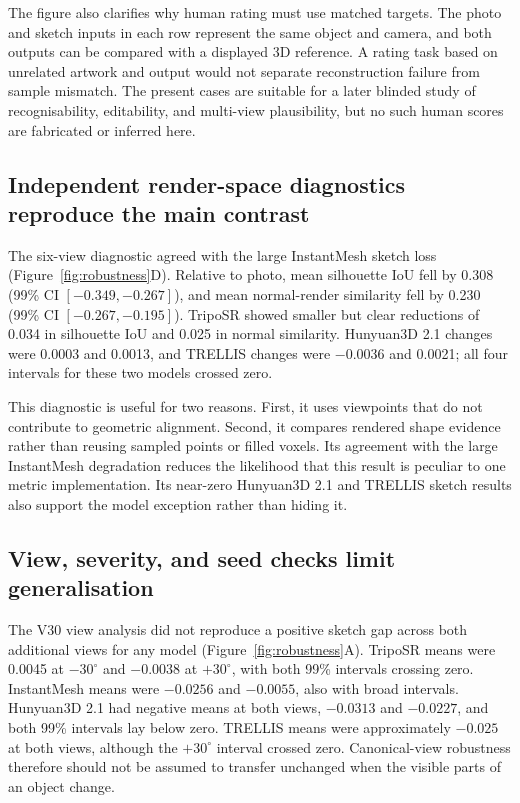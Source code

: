 \documentclass[12pt,a4paper]{article}
\begin{document}
The figure also clarifies why human rating must use matched targets. The photo and sketch inputs in each row represent the same object and camera, and both outputs can be compared with a displayed 3D reference. A rating task based on unrelated artwork and output would not separate reconstruction failure from sample mismatch. The present cases are suitable for a later blinded study of recognisability, editability, and multi-view plausibility, but no such human scores are fabricated or inferred here.

\subsection{Independent render-space diagnostics reproduce the main contrast}

The six-view diagnostic agreed with the large InstantMesh sketch loss (Figure~\ref{fig:robustness}D). Relative to photo, mean silhouette IoU fell by 0.308 (99\% CI $[-0.349,-0.267]$), and mean normal-render similarity fell by 0.230 (99\% CI $[-0.267,-0.195]$). TripoSR showed smaller but clear reductions of 0.034 in silhouette IoU and 0.025 in normal similarity. Hunyuan3D 2.1 changes were 0.0003 and 0.0013, and TRELLIS changes were $-0.0036$ and 0.0021; all four intervals for these two models crossed zero.

This diagnostic is useful for two reasons. First, it uses viewpoints that do not contribute to geometric alignment. Second, it compares rendered shape evidence rather than reusing sampled points or filled voxels. Its agreement with the large InstantMesh degradation reduces the likelihood that this result is peculiar to one metric implementation. Its near-zero Hunyuan3D 2.1 and TRELLIS sketch results also support the model exception rather than hiding it.

\subsection{View, severity, and seed checks limit generalisation}

The V30 view analysis did not reproduce a positive sketch gap across both additional views for any model (Figure~\ref{fig:robustness}A). TripoSR means were 0.0045 at $-30^{\circ}$ and $-0.0038$ at $+30^{\circ}$, with both 99\% intervals crossing zero. InstantMesh means were $-0.0256$ and $-0.0055$, also with broad intervals. Hunyuan3D 2.1 had negative means at both views, $-0.0313$ and $-0.0227$, and both 99\% intervals lay below zero. TRELLIS means were approximately $-0.025$ at both views, although the $+30^{\circ}$ interval crossed zero. Canonical-view robustness therefore should not be assumed to transfer unchanged when the visible parts of an object change.
\end{document}

